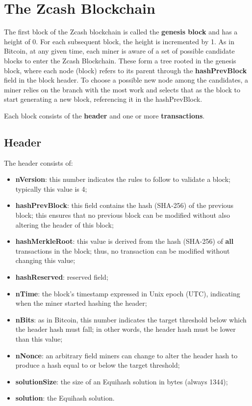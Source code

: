 \section{The Zcash Blockchain}

The first block of the Zcash blockchain is called the \textbf{genesis block} and has a height of 0. For each subsequent block, the height is incremented by 1. As in Bitcoin, at any given time, each miner is aware of a set of possible candidate blocks to enter the Zcash Blockchain. These form a tree rooted in the genesis block, where each node (block) refers to its parent through the \textbf{hashPrevBlock} field in the block header. To choose a possible new node among the candidates, a miner relies on the branch with the most work and selects that as the block to start generating a new block, referencing it in the hashPrevBlock.

\noindent Each block consists of the \textbf{header} and one or more \textbf{transactions}.

\subsection{Header}

The header consists of:
\begin{itemize}
    \item \textbf{nVersion}: this number indicates the rules to follow to validate a block; typically this value is 4;
    \item \textbf{hashPrevBlock}: this field contains the hash (SHA-256) of the previous block; this ensures that no previous block can be modified without also altering the header of this block;
    \item \textbf{hashMerkleRoot}: this value is derived from the hash (SHA-256) of \textbf{all} transactions in the block; thus, no transaction can be modified without changing this value;
    \item \textbf{hashReserved}: reserved field;
    \item \textbf{nTime}: the block's timestamp expressed in Unix epoch (UTC), indicating when the miner started hashing the header;
    \item \textbf{nBits}: as in Bitcoin, this number indicates the target threshold below which the header hash must fall; in other words, the header hash must be lower than this value;
    \item \textbf{nNonce}: an arbitrary field miners can change to alter the header hash to produce a hash equal to or below the target threshold;
    \item \textbf{solutionSize}: the size of an Equihash solution in bytes (always 1344);
    \item \textbf{solution}: the Equihash solution.
\end{itemize}

